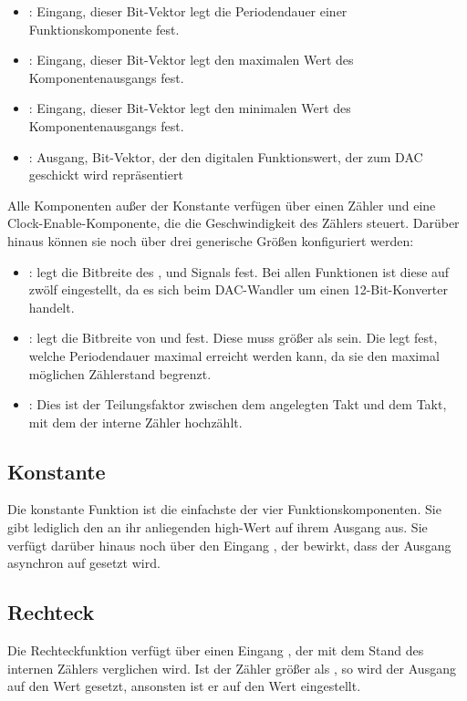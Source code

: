 \begin{itemize}
\item {}: Eingang, dieser Bit-Vektor legt die Periodendauer einer Funktionskomponente fest.
\item {}: Eingang, dieser Bit-Vektor legt den maximalen Wert des Komponentenausgangs fest.
\item {}: Eingang, dieser Bit-Vektor legt den minimalen Wert des Komponentenausgangs fest.
\item {}: Ausgang, Bit-Vektor, der den digitalen Funktionswert, der zum DAC geschickt wird repräsentiert
\end{itemize}

Alle Komponenten außer der Konstante verfügen über einen Zähler und eine Clock-Enable-Komponente, die die Geschwindigkeit des Zählers steuert.
Darüber hinaus können sie noch über drei generische Größen konfiguriert werden:

\begin{itemize}
\item {}: legt die Bitbreite des ,  und  Signals fest.
Bei allen Funktionen ist diese auf zwölf eingestellt, da es sich beim DAC-Wandler um einen 12-Bit-Konverter handelt.
\item {}: legt die Bitbreite von  und  fest.
  Diese muss größer als  sein.
  Die  legt fest, welche Periodendauer maximal erreicht werden kann, da sie den maximal möglichen Zählerstand begrenzt.
\item {}: Dies ist der Teilungsfaktor zwischen dem angelegten Takt und dem Takt, mit dem der interne Zähler hochzählt.
\end{itemize}


\subsection{Konstante}   \label{Comp:Func:Const}
Die konstante Funktion ist die einfachste der vier Funktionskomponenten.
Sie gibt lediglich den an ihr anliegenden high-Wert auf ihrem Ausgang aus.
Sie verfügt darüber hinaus noch über den Eingang , der bewirkt, dass der Ausgang asynchron auf  gesetzt wird.

\subsection{Rechteck}   \label{Comp:Func:Square}
Die Rechteckfunktion verfügt über einen Eingang , der mit dem Stand des internen Zählers verglichen wird.
Ist der Zähler größer als , so wird der Ausgang auf den Wert  gesetzt, ansonsten ist er auf den Wert  eingestellt.

